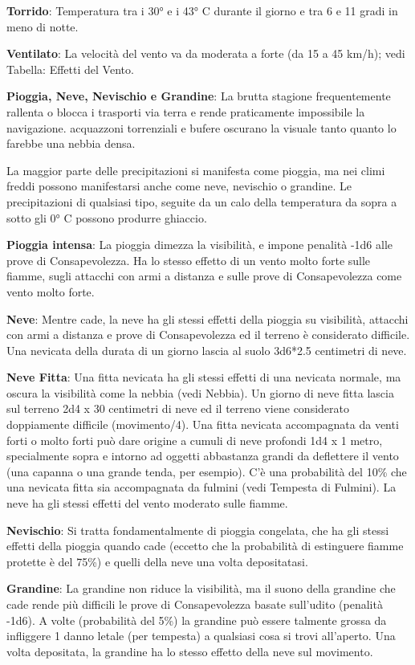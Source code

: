 \begin{multicols}{2}
\textbf{Torrido}: Temperatura tra i 30° e i 43° C durante il giorno e tra 6 e 11 gradi in meno di notte.

\textbf{Ventilato}: La velocità del vento va da moderata a forte (da 15 a 45 km/h); vedi Tabella: Effetti del Vento.

\textbf{Pioggia, Neve, Nevischio e Grandine}: La brutta stagione frequentemente rallenta o blocca i trasporti via terra e rende praticamente impossibile la navigazione. acquazzoni torrenziali e bufere oscurano la visuale tanto quanto lo farebbe una nebbia densa.

La maggior parte delle precipitazioni si manifesta come pioggia, ma nei climi freddi possono manifestarsi anche come neve, nevischio o grandine. Le precipitazioni di qualsiasi tipo, seguite da un calo della temperatura da sopra a sotto gli 0° C possono produrre ghiaccio.

\textbf{Pioggia intensa}: La pioggia dimezza la visibilità, e impone penalità -1d6 alle prove di Consapevolezza. Ha lo stesso effetto di un vento molto forte sulle fiamme, sugli attacchi con armi a distanza e sulle prove di Consapevolezza come vento molto forte.

\textbf{Neve}: Mentre cade, la neve ha gli stessi effetti della pioggia su visibilità, attacchi con armi a distanza e prove di Consapevolezza ed il terreno è considerato difficile. Una nevicata della durata di un giorno lascia al suolo 3d6*2.5 centimetri di neve.

\textbf{Neve Fitta}: Una fitta nevicata ha gli stessi effetti di una nevicata normale, ma oscura la visibilità come la nebbia (vedi Nebbia). Un giorno di neve fitta lascia sul terreno 2d4 x 30 centimetri di neve ed il terreno viene considerato doppiamente difficile (movimento/4). Una fitta nevicata accompagnata da venti forti o molto forti può dare origine a cumuli di neve profondi 1d4 x 1 metro, specialmente sopra e intorno ad oggetti abbastanza grandi da deflettere il vento (una capanna o una grande tenda, per esempio).
C'è una probabilità del 10\% che una nevicata fitta sia accompagnata da fulmini (vedi Tempesta di Fulmini). La neve ha gli stessi effetti del vento moderato sulle fiamme.

\textbf{Nevischio}: Si tratta fondamentalmente di pioggia congelata, che ha gli stessi effetti della pioggia quando cade (eccetto che la probabilità di estinguere fiamme protette è del 75\%) e quelli della neve una volta depositatasi.

\textbf{Grandine}: La grandine non riduce la visibilità, ma il suono della grandine che cade rende più difficili le prove di Consapevolezza basate sull'udito (penalità -1d6). A volte (probabilità del 5\%) la grandine può essere talmente grossa da infliggere 1 danno letale (per tempesta) a qualsiasi cosa si trovi all'aperto. Una volta depositata, la grandine ha lo stesso effetto della neve sul movimento.


\end{multicols}
